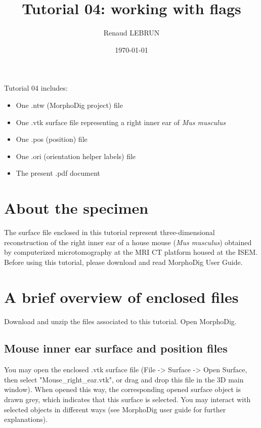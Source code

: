 \documentclass[12pt, a4paper]{book}
\title{Tutorial 04: working with flags}
\author{Renaud LEBRUN}
\affil{Institut des Sciences de l'Evolution, Université de Montpellier, France}
\date{\today}
\begin{document}
	\dominitoc

\maketitle


\faketableofcontents



\minitoc 
Tutorial 04 includes:
\begin{itemize}
\item One .ntw (MorphoDig project) file
\item One .vtk surface file representing a right inner ear of \textit{Mus musculus}
\item One .pos (position) file 
\item One .ori (orientation helper labels) file 
\item The present .pdf document
\end{itemize}





\section{About the specimen}

The surface file enclosed in this tutorial represent three-dimensional reconstruction of the right inner ear of a house mouse (\textit{Mus musculus}) obtained by computerized microtomography at the MRI \si{\micro} CT platform housed at the ISEM.\\
Before using this tutorial, please download and read MorphoDig User Guide.


\section{A brief overview of enclosed files}
		Download and unzip the files associated to this tutorial. Open MorphoDig.
\subsection{Mouse inner ear surface and position files}
	You may open the enclosed .vtk surface file (File -> Surface -> Open Surface, then select "Mouse\_right\_ear.vtk", or drag and drop this file in the 3D main window). When opened
this way, the corresponding opened surface object is drawn grey, which indicates that this surface
is selected. You may interact with selected objects in different ways (see MorphoDig user guide for
further explanations).\\
\end{document}
